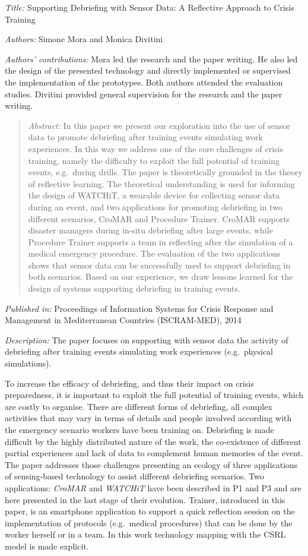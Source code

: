 \emph{Title:} Supporting Debriefing with Sensor Data: A Reflective Approach to Crisis Training

\emph{Authors:} Simone Mora and Monica Divitini

\emph{Authors' contributions:} Mora led the research and the paper writing. He also led the design of the presented technology and directly implemented or supervised the implementation of the prototypes. Both authors attended the evaluation studies. Divitini provided general supervision for the research and the paper writing.

\begin{quote}
	\emph{Abstract:} In this paper we present our exploration into the use of sensor data to promote debriefing after training events simulating work experiences. In this way we address one of the core challenges of crisis training, namely the difficulty to exploit the full potential of training events, e.g.~during drills. The paper is theoretically grounded in the theory of reflective learning. The theoretical understanding is used for informing the design of WATCHiT, a wearable device for collecting sensor data during an event, and two applications for promoting debriefing in two different scenarios, CroMAR and Procedure Trainer. CroMAR supports disaster managers during in-situ debriefing after large events, while Procedure Trainer supports a team in reflecting after the simulation of a medical emergency procedure. The evaluation of the two applications shows that sensor data can be successfully used to support debriefing in both scenarios. Based on our experience, we draw lessons learned for the design of systems supporting debriefing in training events. 
\end{quote}

\emph{Published in:} Proceedings of Information Systems for Crisis Response and Management in Mediterranean Countries (ISCRAM-MED), 2014

\emph{Description:} The paper focuses on supporting with sensor data the activity of debriefing after training events simulating work experiences (e.g.~physical simulations). 

To increase the efficacy of debriefing, and thus their impact on crisis preparedness, it is important to exploit the full potential of training events, which are costly to organise. There are different forms of debriefing, all complex activities that may vary in terms of details and people involved according with the emergency scenario workers have been training on. Debriefing is made difficult by the highly distributed nature of the work, the co-existence of different partial experiences and lack of data to complement human memories of the event. The paper addresses those challenges presenting an ecology of three applications of sensing-based technology to assist different debriefing scenarios. Two applications: \emph{CroMAR} and \emph{WATCHiT} have been described in P1 and P3 and are here presented in the last stage of their evolution. Trainer, introduced in this paper, is an smartphone application to support a quick reflection session on the implementation of protocols (e.g.~medical procedures) that can be done by the worker herself or in a team. In this work technology mapping with the CSRL model is made explicit.

